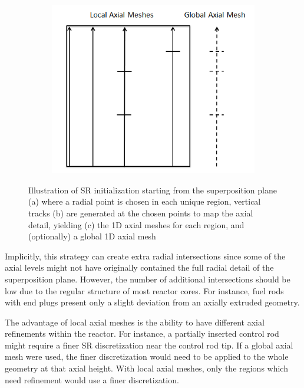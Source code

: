 \begin{figure}[h!]
\begin{subfigure}[b]{0.28\textwidth}
		\caption{}
		\label{fig:fsr-init-b}
	\end{subfigure}
	\begin{subfigure}[b]{0.4\textwidth}
		\centering
		\includegraphics[width=\linewidth]{figures/ph2016/fsr-init-c.PNG}
		\caption{}
		\label{fig:fsr-init-c}
	\end{subfigure}
	\caption[]{Illustration of \ac{SR} initialization starting from the superposition plane (a) where a radial point is chosen in each unique region, vertical tracks (b) are generated at the chosen points to map the axial detail, yielding (c) the 1D axial meshes for each region, and (optionally) a global 1D axial mesh}
	\label{fig:fsr-initialization}
\end{figure}

Implicitly, this strategy can create extra radial intersections since some of the axial levels might not have originally contained the full radial detail of the superposition plane. However, the number of additional intersections should be low due to the regular structure of most reactor cores. For instance, fuel rods with end plugs present only a slight deviation from an axially extruded geometry.

The advantage of local axial meshes is the ability to have different axial refinements within the reactor. For instance, a partially inserted control rod might require a finer \ac{SR} discretization near the control rod tip. If a global axial mesh were used, the finer discretization would need to be applied to the whole geometry at that axial height. With local axial meshes, only the regions which need refinement would use a finer discretization.


